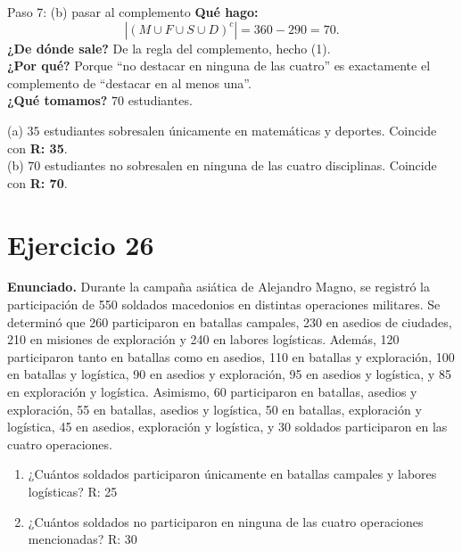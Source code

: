 \documentclass[11pt]{article}
\begin{document}
\begin{sol}
\begin{paso}{Paso 7: (b) pasar al complemento}
\textbf{Qu\'e hago:}
\[
|(M\cup F\cup S\cup D)^{c}| = 360 - 290 = 70 .
\]
\textbf{¿De d\'onde sale?} De la regla del complemento, hecho (1).\\
\textbf{¿Por qu\'e?} Porque ``no destacar en ninguna de las cuatro'' es exactamente el complemento de ``destacar en al menos una''.\\
\textbf{¿Qu\'e tomamos?} $70$ estudiantes.
\end{paso}

\end{sol}

\begin{resp}
(a) $\boxed{35}$ estudiantes sobresalen \'unicamente en matem\'aticas y deportes. Coincide con \textbf{R: 35}.\\
(b) $\boxed{70}$ estudiantes no sobresalen en ninguna de las cuatro disciplinas. Coincide con \textbf{R: 70}.
\end{resp}

\newpage

\section*{Ejercicio 26}

\textbf{Enunciado.} Durante la campa\~na asi\'atica de Alejandro Magno, se registr\'o la participaci\'on de 550 soldados macedonios en distintas operaciones militares. Se determin\'o que 260 participaron en batallas campales, 230 en asedios de ciudades, 210 en misiones de exploraci\'on y 240 en labores log\'isticas. Adem\'as, 120 participaron tanto en batallas como en asedios, 110 en batallas y exploraci\'on, 100 en batallas y log\'istica, 90 en asedios y exploraci\'on, 95 en asedios y log\'istica, y 85 en exploraci\'on y log\'istica. Asimismo, 60 participaron en batallas, asedios y exploraci\'on, 55 en batallas, asedios y log\'istica, 50 en batallas, exploraci\'on y log\'istica, 45 en asedios, exploraci\'on y log\'istica, y 30 soldados participaron en las cuatro operaciones.
\begin{enumerate}[label=(\alph*),leftmargin=*]
\item ¿Cu\'antos soldados participaron \'unicamente en batallas campales y labores log\'isticas? R: 25
\item ¿Cu\'antos soldados no participaron en ninguna de las cuatro operaciones mencionadas? R: 30
\end{enumerate}
\end{document}
